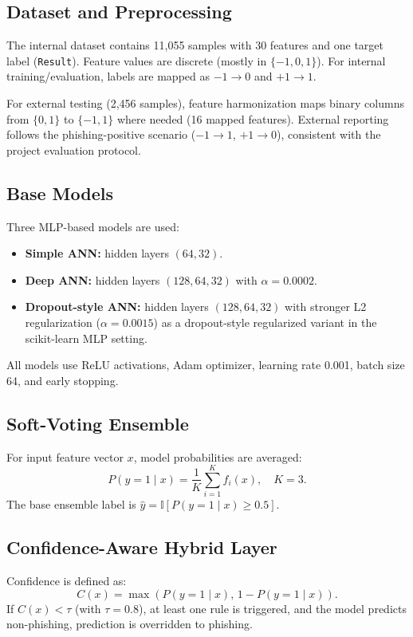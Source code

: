 ﻿\documentclass[conference]{IEEEtran}
\begin{document}
\subsection{Dataset and Preprocessing}
The internal dataset contains 11,055 samples with 30 features and one target label (\texttt{Result}). Feature values are discrete (mostly in $\{-1,0,1\}$). For internal training/evaluation, labels are mapped as $-1 \rightarrow 0$ and $+1 \rightarrow 1$. 

For external testing (2,456 samples), feature harmonization maps binary columns from $\{0,1\}$ to $\{-1,1\}$ where needed (16 mapped features). External reporting follows the phishing-positive scenario ($-1 \rightarrow 1$, $+1 \rightarrow 0$), consistent with the project evaluation protocol.

\subsection{Base Models}
Three MLP-based models are used:
\begin{itemize}
    \item \textbf{Simple ANN:} hidden layers $(64,32)$.
    \item \textbf{Deep ANN:} hidden layers $(128,64,32)$ with $\alpha=0.0002$.
    \item \textbf{Dropout-style ANN:} hidden layers $(128,64,32)$ with stronger L2 regularization ($\alpha=0.0015$) as a dropout-style regularized variant in the scikit-learn MLP setting.
\end{itemize}
All models use ReLU activations, Adam optimizer, learning rate 0.001, batch size 64, and early stopping.

\subsection{Soft-Voting Ensemble}
For input feature vector $x$, model probabilities are averaged:
\begin{equation}
P(y=1\mid x)=\frac{1}{K}\sum_{i=1}^{K}f_i(x),\quad K=3.
\end{equation}
The base ensemble label is $\hat{y}=\mathbb{I}[P(y=1\mid x)\ge 0.5]$.

\subsection{Confidence-Aware Hybrid Layer}
Confidence is defined as:
\begin{equation}
C(x)=\max\left(P(y=1\mid x),\,1-P(y=1\mid x)\right).
\end{equation}
If $C(x)<\tau$ (with $\tau=0.8$), at least one rule is triggered, and the model predicts non-phishing, prediction is overridden to phishing.
\end{document}
